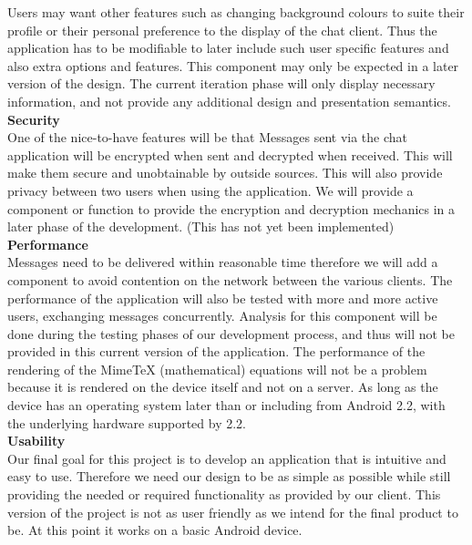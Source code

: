 \documentclass[29pt,a4paper]{moderncv}
\begin{document}
			Users may want other features such as changing background colours to suite their profile or their personal preference to the display of the chat client. Thus the application has to be modifiable to later include such user specific features and also extra options and features.  This component may only be expected in a later version of the design.  The current iteration phase will only display necessary information, and not provide any additional design and presentation semantics.
			\\  			
			
			\noindent\textbf{Security}\\
				One of the nice-to-have features will be that Messages sent via the chat application will be encrypted when sent and decrypted when received. This will make them secure and unobtainable by outside sources. This will also provide privacy between two users when using the application. We will provide a component or function to provide the encryption and decryption mechanics in a later phase of the development. (This has not yet been implemented)\\
			
			\noindent\textbf{Performance}\\
				Messages need to be delivered within reasonable time therefore we will add a component to avoid contention on the network between the various clients. The performance of the application will also be tested with more and more active users, exchanging messages concurrently. Analysis for this component will be done during the testing phases of our development process, and thus will not be provided in this current version of the application.
				The performance of the rendering of the MimeTeX (mathematical) equations will not be a problem because it is rendered on the device itself and not on a server. As long as the device has an operating system later than or including from Android 2.2, with the underlying hardware supported by 2.2.\\
				
			\noindent\textbf{Usability}
				\\Our final goal for this project is to develop an application that is intuitive and easy to use.  Therefore we need our design to be as simple as possible while still providing the needed or required functionality as provided by our client.  This version of the project is not as user friendly as we intend for the final product to be.  At this point it works on a basic Android device.  
				
\end{document}
